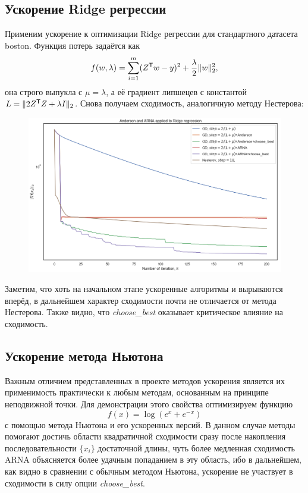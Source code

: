 \documentclass[12pt]{article}
\theoremstyle{definition}
\numberwithin{Def}{section}
\numberwithin{Th}{section}
\numberwithin{Prop}{section}
\numberwithin{St}{section}
\numberwithin{Cor}{section}
\begin{document}
\subsection{Ускорение Ridge регрессии}

Применим ускорение к оптимизации Ridge регрессии для стандартного датасета
boston. Функция потерь задаётся как
$$
f(w, \lambda)=\sum_{i=1}^m (Z^\mathsf{T}w-y)^2+\dfrac\lambda2 \|w\|_2^2,
$$
она строго выпукла с $\mu=\lambda$, а её градиент липшецев с константой
$L=\|2Z^\mathsf{T}Z+\lambda I\|_2$. Снова получаем сходимость, аналогичную
методу Нестерова:
\begin{figure}[H]
  \includegraphics[width=\linewidth]{ridge.png}
\end{figure}
Заметим, что хоть на начальном этапе ускоренные алгоритмы и вырываются вперёд,
в дальнейшем характер сходимости почти не отличается от метода Нестерова.
Также видно, что \textit{choose\_best} оказывает критическое влияние на
сходимость.

\subsection{Ускорение метода Ньютона}

Важным отличием представленных в проекте методов ускорения является их
применимость практически к любым методам, основанным на принципе неподвижной
точки. Для демонстрации этого свойства оптимизируем функцию
$$
f(x)=\log(e^x+e^{-x})
$$
с помощью метода Ньютона и его ускоренных версий. В данном случае методы
помогают достичь области квадратичной сходимости сразу после накопления
последовательности $\{x_i\}$ достаточной длины, чуть более медленная сходимость
ARNA объясняется более удачным попаданием в эту область, ибо в дальнейшем,
как видно в сравнении с обычным методом Ньютона, ускорение не участвует
в сходимости в силу опции \textit{choose\_best}.
\newpage
\end{document}
